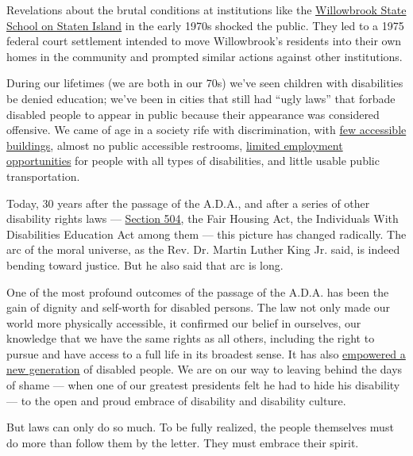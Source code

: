 Revelations about the brutal conditions at institutions like the
\href{https://www.nytimes.com/2020/02/21/nyregion/willowbrook-state-school-staten-island.html}{Willowbrook
State School on Staten Island} in the early 1970s shocked the public.
They led to a 1975 federal court settlement intended to move
Willowbrook's residents into their own homes in the community and
prompted similar actions against other institutions.

During our lifetimes (we are both in our 70s) we've seen children with
disabilities be denied education; we've been in cities that still had
``ugly laws'' that forbade disabled people to appear in public because
their appearance was considered offensive. We came of age in a society
rife with discrimination, with
\href{https://www.nytimes.com/2020/07/20/arts/disabilities-architecture-design.html}{few
accessible buildings}, almost no public accessible restrooms,
\href{https://www.nytimes.com/2020/07/23/business/disability-discrimination-jobs-sheltered-workshop.html}{limited
employment opportunities} for people with all types of disabilities, and
little usable public transportation.

Today, 30 years after the passage of the A.D.A., and after a series of
other disability rights laws ---
\href{https://www.nytimes.com/2020/07/22/us/504-sit-in-disability-rights.html}{Section
504}, the Fair Housing Act, the Individuals With Disabilities Education
Act among them --- this picture has changed radically. The arc of the
moral universe, as the Rev. Dr. Martin Luther King Jr. said, is indeed
bending toward justice. But he also said that arc is long.

One of the most profound outcomes of the passage of the A.D.A. has been
the gain of dignity and self-worth for disabled persons. The law not
only made our world more physically accessible, it confirmed our belief
in ourselves, our knowledge that we have the same rights as all others,
including the right to pursue and have access to a full life in its
broadest sense. It has also
\href{https://www.nytimes.com/2020/07/17/style/americans-with-disabilities-act.html}{empowered
a new generation} of disabled people. We are on our way to leaving
behind the days of shame --- when one of our greatest presidents felt he
had to hide his disability --- to the open and proud embrace of
disability and disability culture.

But laws can only do so much. To be fully realized, the people
themselves must do more than follow them by the letter. They must
embrace their spirit.

